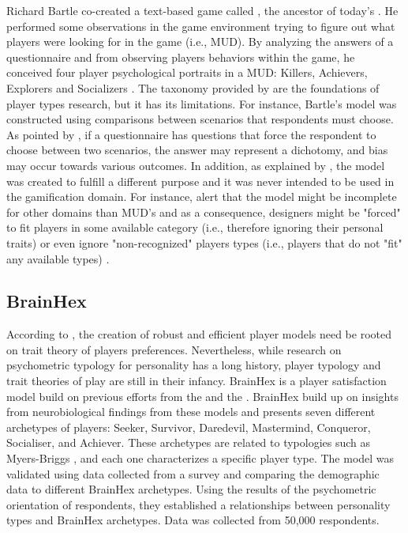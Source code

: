 Richard Bartle co-created a text-based game called , the ancestor of today's . 
He performed some observations in the game environment trying to figure out what players were looking for in the game (i.e., MUD). 
By analyzing the answers of a questionnaire and from observing players behaviors within the game, he conceived four player psychological portraits in a MUD: Killers, Achievers, Explorers and Socializers \cite{Bartle1996}. 
The taxonomy provided by \citeauthor{Bartle1996} are the foundations of player types research, but it has its limitations. 
For instance, Bartle's model was constructed using comparisons between scenarios that respondents must choose. 
As pointed by \citeauthor{yee2006motivations}, if a questionnaire has questions that force the respondent to choose between two scenarios, the answer may represent a dichotomy, and bias may occur towards various outcomes.
In addition, as explained by \citeauthor{Bartle2009}, the model was created to fulfill a different purpose and it was never intended to be used in the gamification domain.
For instance, \citeauthor{youtube_bartle} alert that the model might be incomplete for other domains than MUD's and as a consequence, designers might be "forced" to fit players in some available category  (i.e., therefore ignoring their personal traits) or even ignore "non-recognized" players types (i.e., players that do not "fit" any available types) \cite{Bartle2009}.


\subsection{BrainHex}
\label{sec:BrainHex}

According to \cite{bateman2011player}, the creation of robust and efficient player models need be rooted on trait theory of players preferences. 
Nevertheless, while research on psychometric typology for personality has a long history, player typology and trait theories of play are still in their infancy. 
BrainHex is a player satisfaction model build on previous efforts from the  and the  \cite{Nacke2014}. 
BrainHex build up on insights from neurobiological findings from these models and presents seven different archetypes of players: Seeker, Survivor, Daredevil, Mastermind, Conqueror, Socialiser, and Achiever. These archetypes are related to typologies such as Myers-Briggs \cite{myers1985manual}, and each one characterizes a specific player type.
The model was validated using data collected from a survey and comparing the demographic data to different BrainHex archetypes. Using the results of the psychometric orientation of respondents, they established a relationships between personality types and BrainHex archetypes. Data was collected from 50,000 respondents.

